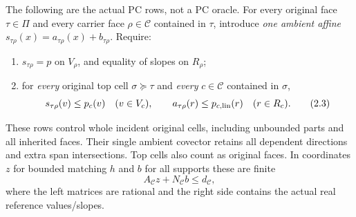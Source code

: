 \documentclass[11pt]{article}
\begin{document}
The following are the actual PC rows, not a PC oracle. For every original face $\tau\in\Pi$ and every carrier face $\rho\in\mathcal C$ contained in $\tau$, introduce \emph{one ambient affine} $s_{\tau\rho}(x)=a_{\tau\rho}(x)+b_{\tau\rho}$. Require:
\begin{enumerate}
\item $s_{\tau\rho}=p$ on $V_\rho$, and equality of slopes on $R_\rho$;
\item for \emph{every} original top cell $\sigma\succeq\tau$ and \emph{every} $c\in\mathcal C$ contained in $\sigma$,
\[
 s_{\tau\rho}(v)\leq p_c(v)\quad(v\in V_c),\qquad
 a_{\tau\rho}(r)\leq p_{c,\rm lin}(r)\quad(r\in R_c).                 \tag{2.3}
\]
\end{enumerate}
These rows control whole incident original cells, including unbounded parts and all inherited faces. Their single ambient covector retains all dependent directions and extra span intersections. Top cells also count as original faces. In coordinates $z$ for bounded matching $h$ and $b$ for all supports these are finite
\[
               A_\mathcal C z+N_\mathcal C b\leq d_\mathcal C,          \tag{2.4}
\]
where the left matrices are rational and the right side contains the actual real reference values/slopes.
\end{document}
